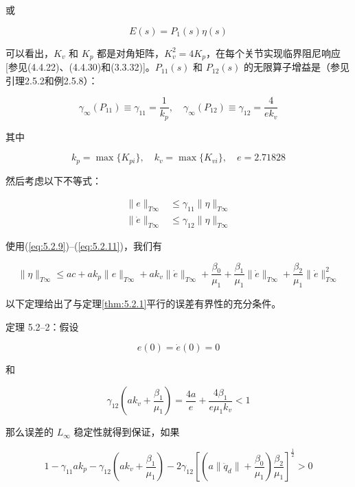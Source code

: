 \documentclass[UTF8,12pt,a4paper]{ctexart}
\begin{document}
或

\begin{equation}\label{eq:5.2.24}
E(s) = P_1(s)\eta(s)
\end{equation}

可以看出，$K_v$ 和 $K_p$ 都是对角矩阵，$K_v^2 = 4K_p$，在每个关节实现临界阻尼响应[参见(4.4.22)、(4.4.30)和(3.3.32)]。$P_{11}(s)$ 和 $P_{12}(s)$ 的无限算子增益是（参见引理2.5.2和例2.5.8）：

\begin{equation}\label{eq:5.2.25}
\gamma_\infty(P_{11}) \equiv \gamma_{11} = \frac{1}{k_p}, \quad \gamma_\infty(P_{12}) \equiv \gamma_{12} = \frac{4}{ek_v}
\end{equation}

其中

\begin{equation}\label{eq:5.2.26}
k_p = \max\{K_{pi}\}, \quad k_v = \max\{K_{vi}\}, \quad e = 2.71828
\end{equation}

然后考虑以下不等式：

\begin{align}
\|e\|_{T\infty} &\leq \gamma_{11}\|\eta\|_{T\infty} \\
\|\dot{e}\|_{T\infty} &\leq \gamma_{12}\|\eta\|_{T\infty}
\end{align}

使用(\ref{eq:5.2.9})--(\ref{eq:5.2.11})，我们有

\begin{equation}\label{eq:5.2.27}
\|\eta\|_{T\infty} \leq ac + ak_p\|e\|_{T\infty} + ak_v\|\dot{e}\|_{T\infty} + \frac{\beta_0}{\mu_1} + \frac{\beta_1}{\mu_1}\|\dot{e}\|_{T\infty} + \frac{\beta_2}{\mu_1}\|\dot{e}\|_{T\infty}^2
\end{equation}

以下定理给出了与定理\ref{thm:5.2.1}平行的误差有界性的充分条件。

\begin{theorem}\label{thm:5.2.2}
定理 5.2--2：假设

\begin{equation}
e(0) = \dot{e}(0) = 0
\end{equation}

和

\begin{equation}
\gamma_{12}\left(ak_v + \frac{\beta_1}{\mu_1}\right) = \frac{4a}{e} + \frac{4\beta_1}{e\mu_1 k_v} < 1
\end{equation}

那么误差的 $L_\infty$ 稳定性就得到保证，如果

\begin{equation}
1 - \gamma_{11}ak_p - \gamma_{12}\left(ak_v + \frac{\beta_1}{\mu_1}\right) - 2\gamma_{12}\left[\left(a\|\ddot{q}_d\| + \frac{\beta_0}{\mu_1}\right)\frac{\beta_2}{\mu_1}\right]^{\frac{1}{2}} > 0
\end{equation}
\end{theorem}
\end{document}
